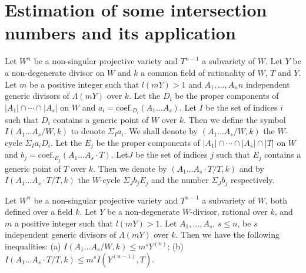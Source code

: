 \section{Estimation of some intersection numbers and its application}\label{art14-sec4}

Let $W^{n}$ be a non-singular projective variety and $T^{n-1}$ a subvariety of $W$. Let $Y$ be a non-degenerate divisor on $W$ and $k$ a common field of rationality of $W$, $T$ and $Y$. Let $m$ be a positive integer such that $l(mY)>1$ and $A_{1},\ldots,A_{n} n$ independent generic divisors of $\Lambda(mY)$ over $k$. Let the $D_{i}$ be the proper components of $|A_{1}|\cap \cdots \cap |A_{s}|$ on $W$ and $a_{i}=\text{coef.}_{D_{i}}(A_{1}\ldots A_{s})$. Let $I$ be the set of indices $i$ such that $D_{i}$ contains a generic point of $W$ over $k$. Then we define the symbol $I(A_{1}\ldots A_{s}/W,k)$ to denote $\Sigma_{I}a_{i}$. We shall denote by $(A_{1}\ldots A_{s}/W,k)$ the $W$-cycle $\Sigma_{I}a_{i}D_{i}$. Let the $E_{j}$ be the proper components of $|A_{1}|\cap \cdots \cap | A_{s}|\cap |T|$ on $W$ and $b_{j}=\text{coef.}_{E_{j}}(A_{1}\ldots A_{s}\cdot T)$. Let\pageoriginale $J$ be the set of indices $j$ such that $E_{j}$ contains a generic point of $T$ over $k$. Then we denote by $(A_{1}\ldots A_{s}\cdot T/T,k)$ and by $I(A_{1}\ldots A_{s}\cdot T/T,k)$ the $W$-cycle $\Sigma_{J}b_{j}E_{j}$ and the number $\Sigma_{J}b_{j}$ respectively.

\begin{lemma}\label{art14-lem5}
Let $W^{n}$ be a non-singular projective variety and $T^{n-1}$ a subvariety of $W$, both defined over a field $k$. Let $Y$ be a non-degenerate $W$-divisor, rational over $k$, and $m$ a positive integer such that $l(mY)>1$. Let $A_{1},\ldots,A_{s}$, $s\leq n$, be $s$ independent generic divisors of $\Lambda (mY)$ over $k$. Then we have the following inequalities: {\rm(a)} $I(A_{1}\ldots A_{s}/W,k)\leq m^{s}Y^{(n)}$; {\rm(b)} $I(A_{1}\ldots A_{s}\cdot T/T,k)\leq m^{s}I(Y^{(n-1)},T)$.
\end{lemma}

